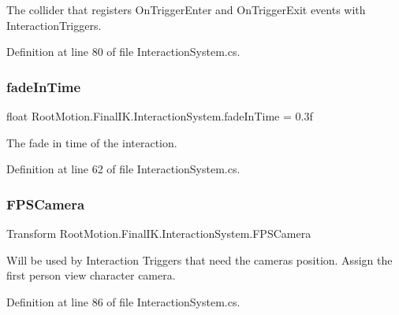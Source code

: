 The collider that registers On\+Trigger\+Enter and On\+Trigger\+Exit events with Interaction\+Triggers. 



Definition at line 80 of file Interaction\+System.\+cs.

\mbox{\label{class_root_motion_1_1_final_i_k_1_1_interaction_system_adb17577d7290a11cad5e2ef1ba78565d}} 
\subsubsection{\texorpdfstring{fade\+In\+Time}{fadeInTime}}
{\footnotesize\ttfamily float Root\+Motion.\+Final\+I\+K.\+Interaction\+System.\+fade\+In\+Time = 0.\+3f}



The fade in time of the interaction. 



Definition at line 62 of file Interaction\+System.\+cs.

\mbox{\label{class_root_motion_1_1_final_i_k_1_1_interaction_system_abf5377b3491c35998b2dc004499ab851}} 
\subsubsection{\texorpdfstring{F\+P\+S\+Camera}{FPSCamera}}
{\footnotesize\ttfamily Transform Root\+Motion.\+Final\+I\+K.\+Interaction\+System.\+F\+P\+S\+Camera}



Will be used by Interaction Triggers that need the camera\textquotesingle{}s position. Assign the first person view character camera. 



Definition at line 86 of file Interaction\+System.\+cs.

